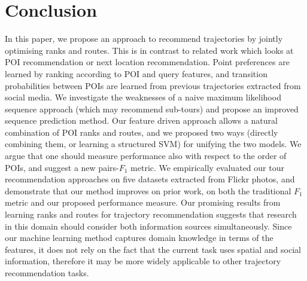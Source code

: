 \section{Conclusion}
\label{sec:conclusion}

In this paper, we propose an approach to recommend trajectories
by jointly optimising ranks and routes.
This is in contrast to related work which looks at
POI recommendation or next location recommendation.
Point preferences are learned by ranking according to POI and query features,
and transition probabilities between POIs are learned from previous trajectories extracted
from social media.
We investigate the weaknesses of a naive maximum likelihood sequence approach (which
may recommend sub-tours) and propose an improved sequence prediction method.
Our feature driven approach allows a natural combination of POI ranks and routes,
and we proposed two ways (directly combining them, or learning a structured SVM)
for unifying the two models.
We argue that one should measure performance also with respect to the order of POIs, and
suggest a new pairs-$F_1$ metric.
We empirically evaluated our tour recommendation approaches on five datasets extracted from
Flickr photos, and demonstrate that our method improves on prior work, on both the traditional
$F_1$ metric and our proposed performance measure.
Our promising results from learning ranks and routes for trajectory recommendation suggests
that research in this domain should consider both information sources simultaneously.
Since our machine learning method captures domain knowledge in terms of the features,
it does not rely on the fact that the current task uses spatial and social information,
therefore it may be more widely applicable to other trajectory recommendation tasks.
